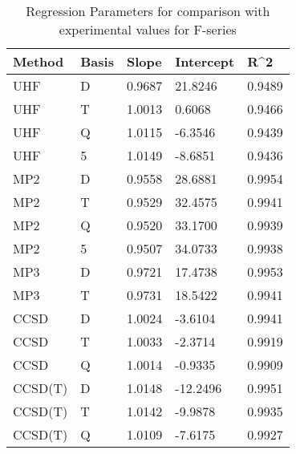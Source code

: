 \begin{table}
  \caption{Regression Parameters for comparison with experimental values for F-series}
  \label{tbl:regression-exp-f}
  \begin{tabular}{l l l l l }
    \hline
    Method & Basis & Slope & Intercept & R^2 \\ 
    \hline
    UHF & D & 0.9687 & 21.8246 & 0.9489 \\ 
    UHF & T & 1.0013 & 0.6068 & 0.9466 \\ 
    UHF & Q & 1.0115 & -6.3546 & 0.9439 \\ 
    UHF & 5 & 1.0149 & -8.6851 & 0.9436 \\ 
    MP2 & D & 0.9558 & 28.6881 & 0.9954 \\ 
    MP2 & T & 0.9529 & 32.4575 & 0.9941 \\ 
    MP2 & Q & 0.9520 & 33.1700 & 0.9939 \\ 
    MP2 & 5 & 0.9507 & 34.0733 & 0.9938 \\ 
    MP3 & D & 0.9721 & 17.4738 & 0.9953 \\ 
    MP3 & T & 0.9731 & 18.5422 & 0.9941 \\ 
    CCSD & D & 1.0024 & -3.6104 & 0.9941 \\ 
    CCSD & T & 1.0033 & -2.3714 & 0.9919 \\ 
    CCSD & Q & 1.0014 & -0.9335 & 0.9909 \\ 
    CCSD(T) & D & 1.0148 & -12.2496 & 0.9951 \\ 
    CCSD(T) & T & 1.0142 & -9.9878 & 0.9935 \\ 
    CCSD(T) & Q & 1.0109 & -7.6175 & 0.9927 \\ 
    \hline
  \end{tabular}
\end{table}
